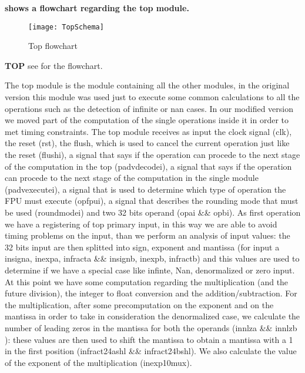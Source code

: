\textbf{
 shows a flowchart regarding the top module.}
\newline

\begin{figure}
\centering\texttt{[image: TopSchema]}
\caption{Top flowchart}	
\label{fig:top_schema}
\end{figure}

\textbf{TOP} see
 for the flowchart.
\newline

The top module is the module containing all the other modules, in the original version this module was used just to execute some common calculations to all the operations such as the detection of infinite or nan cases. In our modified version we moved part of the computation of the single operations inside it in order to met timing constraints.
The top module receives as input the clock signal (clk), the reset (rst), the flush, which is used to cancel the current operation just like the reset (flush\textunderscore i), a signal that says if the operation can procede to the next stage of the computation in the top (padv\textunderscore decode\textunderscore i), a signal that says if the operation can procede to the next stage of the computation in the single module (padv\textunderscore execute\textunderscore i), a signal that is used to determine which type of operation the FPU must execute (op\textunderscore fpu\textunderscore i), a signal that describes the rounding mode that must be used (round\textunderscore mode\textunderscore i) and two 32 bits operand (opa\textunderscore i \&\& opb\textunderscore i).
As first operation we have a registering of top primary input, in this way we are able to avoid timing problems on the input, than we perform an analysis of input values: the 32 bits input are then splitted into sign, exponent and mantissa (for input a in\textunderscore signa, in\textunderscore expa, in\textunderscore fracta \&\& in\textunderscore signb, in\textunderscore expb, in\textunderscore fractb) and this values are used to determine if we have a special case like infinte, Nan, denormalized or zero input.
At this point we have some computation regarding the multiplication (and the future division), the integer to float conversion and the addition/subtraction. 
For the multiplication, after some precomputation on the exponent and on the mantissa in order to take in consideration the denormalized case, we calculate the number of leading zeros in the mantissa for both the operands (in\textunderscore nlza \&\& in\textunderscore nlzb ): these values are then used to shift the mantissa to obtain a mantissa with a 1 in the first position (in\textunderscore fract24a\textunderscore shl \&\& in\textunderscore fract24b\textunderscore shl). We also calculate the value of the exponent of the multiplication (in\textunderscore exp10mux). 

